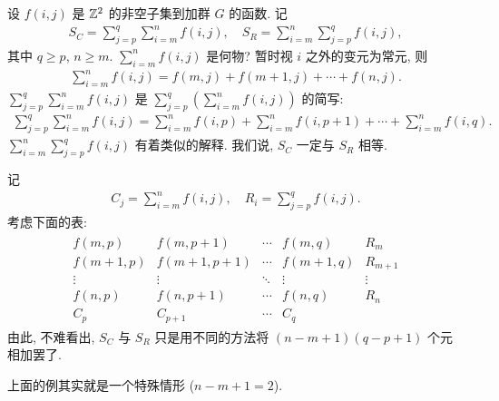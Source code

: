 \begin{remark}
    设 $f(i,j)$ 是 $\mathbb{Z}^2$ 的非空子集到加群 $G$ 的函数. 记
    \begin{align*}
        S_C = \sum_{j=p}^{q} \sum_{i=m}^{n} f(i,j), \quad S_R = \sum_{i=m}^{n} \sum_{j=p}^{q} f(i,j),
    \end{align*}
    其中 $q \geq p$, $n \geq m$. $\sum_{i=m}^{n} f(i,j)$ 是何物? 暂时视 $i$ 之外的变元为常元, 则
    \begin{align*}
        \sum_{i=m}^{n} f(i,j) = f(m,j) + f(m+1,j) + \cdots + f(n,j).
    \end{align*}
    $\sum_{j=p}^{q} \sum_{i=m}^{n} f(i,j)$ 是 $\sum_{j=p}^{q} \left( \sum_{i=m}^{n} f(i,j) \right)$ 的简写:
    \begin{align*}
        \sum_{j=p}^{q} \sum_{i=m}^{n} f(i,j) = \sum_{i=m}^{n} f(i,p) + \sum_{i=m}^{n} f(i,p+1) + \cdots + \sum_{i=m}^{n} f(i,q).
    \end{align*}
    $\sum_{i=m}^{n} \sum_{j=p}^{q} f(i,j)$ 有着类似的解释. 我们说, $S_C$ 一定与 $S_R$ 相等.

    记
    \begin{align*}
        C_j = \sum_{i=m}^{n} f(i,j), \quad R_i = \sum_{j=p}^{q} f(i,j).
    \end{align*}
    考虑下面的表:
    \begin{align*}
        \begin{array}{cccc|c}
            f(m,p)   & f(m,p+1)   & \cdots & f(m,q)   & R_{m}   \\
            f(m+1,p) & f(m+1,p+1) & \cdots & f(m+1,q) & R_{m+1} \\
            \vdots   & \vdots     & \ddots & \vdots   & \vdots  \\
            f(n,p)   & f(n,p+1)   & \cdots & f(n,q)   & R_{n}   \\ \hline
            C_{p}    & C_{p+1}    & \cdots & C_{q}    & \
        \end{array}
    \end{align*}
    由此, 不难看出, $S_C$ 与 $S_R$ 只是用不同的方法将 $(n-m+1)(q-p+1)$ 个元相加罢了.
\end{remark}

\begin{remark}
    上面的例其实就是一个特殊情形 ($n - m + 1 = 2$).
\end{remark}

\subsubsection*{\Rings}

